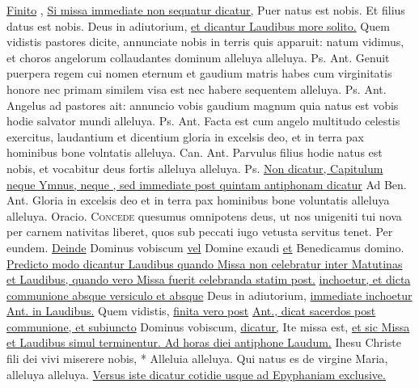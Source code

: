 \begin{multicols*}{2}
 \ul{Finito} , \ul{Si missa immediate non sequatur dicatur,} \V Puer natus est nobis. \R Et filius datus est nobis. Deus in adiutorium, \ul{et dicantur Laudibus more solito.}
 Quem vidistis pastores dicite, annunciate nobis in terris quis apparuit: natum vidimus, et choros angelorum collaudantes dominum alleluya alleluya. {\color{Red} Ps.}  {\color{Red} Ant.} Genuit puerpera regem cui nomen eternum et gaudium matris habes cum virginitatis honore nec primam similem visa est nec habere sequentem alleluya. {\color{Red} Ps.}  {\color{Red} Ant.} Angelus ad pastores ait: annuncio vobis gaudium magnum quia natus est vobis hodie salvator mundi alleluya. {\color{Red} Ps.}  {\color{Red} Ant.} Facta est cum angelo multitudo celestis exercitus, laudantium et dicentium gloria in excelsis deo, et in terra pax hominibus bone volntatis alleluya. {\color{Red} Can.}  {\color{Red} Ant.} Parvulus filius hodie natus est nobis, et vocabitur deus fortis alleluya alleluya. {\color{Red} Ps.} 
\newline \ul{Non dicatur, Capitulum neque Ymnus, neque \Vbar , sed immediate post quintam antiphonam dicatur} {\color{Red} Ad Ben. Ant.} Gloria in excelsis deo et in terra pax hominibus bone voluntatis alleluya alleluya. {\color{Red} Oracio.}
\lettrine[lines=2]{\zallmancaps \color{Blue} C}{oncede} \hypertarget{concede-nativitas}{quesumus} omnipotens deus, ut nos unigeniti tui nova per carnem nativitas liberet, quos sub peccati iugo vetusta servitus tenet. Per eundem.
\newline \ul{Deinde} Dominus vobiscum \ul{vel} Domine exaudi \ul{et} Benedicamus domino. \ul{Predicto modo dicantur Laudibus quando Missa non celebratur inter Matutinas et Laudibus, quando vero Missa fuerit celebranda statim post.}  \ul{inchoetur, et dicta communione absque versiculo et absque} Deus in adiutorium, \ul{immediate inchoetur Ant. in Laudibus.} Quem vidistis, \ul{finita vero post}  \ul{Ant., dicat sacerdos post communione, et subiuncto} Dominus vobiscum, \ul{dicatur,} Ite missa est, \ul{et sic Missa et Laudibus simul terminentur. Ad horas diei antiphone Laudum.}
 \R Ihesu Christe fili dei vivi miserere nobis, * Alleluia alleluya. \V Qui natus es de virgine Maria, alleluya alleluya. \ul{Versus iste dicatur cotidie usque ad Epyphaniam exclusive.}

\end{multicols*}
